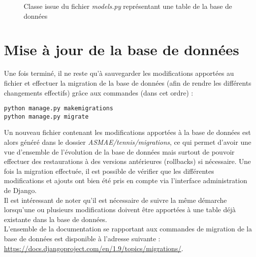 \begin{figure}[!ht]
\centering

\caption{Classe issue du fichier \textit{models.py} représentant une table de la base de données}
\label{fig:Classe issue du fichier models.py représentant une table de la base de données}
\end{figure}
\FloatBarrier

\section{Mise à jour de la base de données}

Une fois terminé, il ne reste qu'à sauvegarder les modifications apportées au fichier et effectuer la migration de la base de données (afin de rendre les différents changements effectifs) grâce aux commandes (dans cet ordre) :

\begin{verbatim}
python manage.py makemigrations
python manage.py migrate
\end{verbatim}

Un nouveau fichier contenant les modifications apportées à la base de données est alors généré dans le dossier \textit{ASMAE/tennis/migrations}, ce qui permet d'avoir une vue d'ensemble de l'évolution de la base de données mais surtout de pouvoir effectuer des restaurations à des versions antérieures (rollbacks) si nécessaire. Une fois la migration effectuée, il est possible de vérifier que les différentes modifications et ajouts ont bien été pris en compte via l'interface administration de Django.\\

Il est intéressant de noter qu'il est nécessaire de suivre la même démarche lorsqu'une ou plusieurs modifications doivent être apportées à une table déjà existante dans la base de données.\\

L'ensemble de la documentation se rapportant aux commandes de migration de la base de données est disponible à l'adresse suivante : \url{https://docs.djangoproject.com/en/1.9/topics/migrations/}.\\
